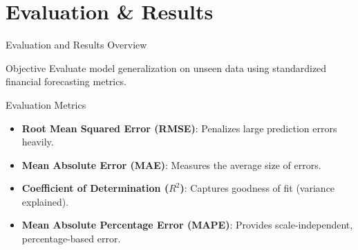 \section{Evaluation \& Results} 
			
\begin{frame}[shrink]{Evaluation and Results Overview}

\begin{block}{Objective}
    Evaluate \alert{model generalization on unseen data} using standardized 
    financial forecasting metrics.
\end{block}

\vspace{0.5em}

\begin{block}{Evaluation Metrics}
\begin{itemize}
    \item \textbf{Root Mean Squared Error (RMSE)}: Penalizes large prediction errors heavily.
    \item \textbf{Mean Absolute Error (MAE)}: Measures the average size of errors.
    \item \textbf{Coefficient of Determination ($R^2$)}: Captures goodness of fit (variance explained).
    \item \textbf{Mean Absolute Percentage Error (MAPE)}: Provides scale-independent, percentage-based
    error.
\end{itemize}
\end{block}

\end{frame}

